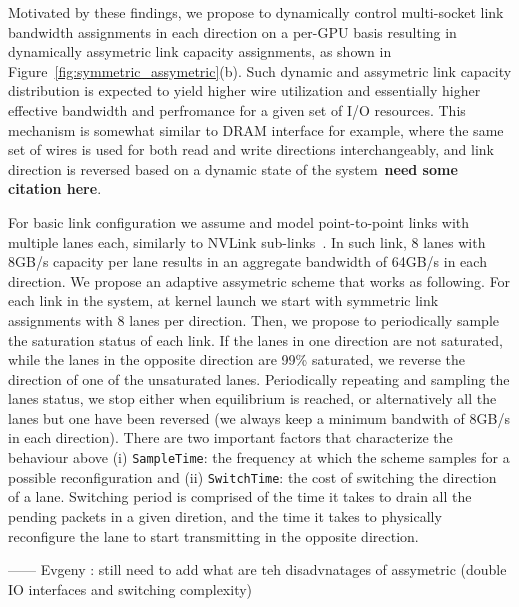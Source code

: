 Motivated by these findings, we propose to dynamically control multi-socket
link bandwidth assignments in each direction on a per-GPU basis resulting in
dynamically assymetric link capacity assignments, as shown in
Figure~\ref{fig:symmetric_assymetric}(b). Such dynamic and assymetric link
capacity distribution is expected to yield higher wire utilization and
essentially higher effective bandwidth and perfromance for a given set of I/O
resources. This mechanism is somewhat similar to DRAM interface for example,
where the same set of wires is used for both read and write directions
interchangeably, and link direction is reversed based on a dynamic state of the
system~\textbf{need some citation here}. 

For basic link configuration we assume and model point-to-point
links with multiple lanes each, similarly to NVLink
sub-links~\cite{pascal-tesla-wp}.  In such link, 8 lanes with 8GB/s capacity
per lane results in an aggregate bandwidth of 64GB/s in each direction. We
propose an adaptive assymetric scheme that works as following. For each link
in the system, at kernel launch we start with symmetric link assignments with 8
lanes per direction. Then, we propose to periodically sample the saturation
status of each link. If the lanes in one direction are not saturated, while the
lanes in the opposite direction are 99\% saturated, we reverse the direction of
one of the unsaturated lanes. Periodically repeating and sampling the lanes
status, we stop either when equilibrium is reached, or alternatively all the lanes but one
have been reversed (we always keep a minimum bandwith of 8GB/s in each
direction).  
There are two important factors that characterize the
behaviour above (i) \texttt{SampleTime}: the frequency at which the scheme samples for a
possible reconfiguration and (ii) \texttt{SwitchTime}: the cost of switching the direction of a
lane. Switching period is comprised of the time
it takes to drain all the pending packets in a given diretion, and the time it
takes to physically reconfigure the lane to start transmitting in the opposite
direction.

------  Evgeny : still need to add what are teh disadvnatages of assymetric
(double IO interfaces and switching complexity)



